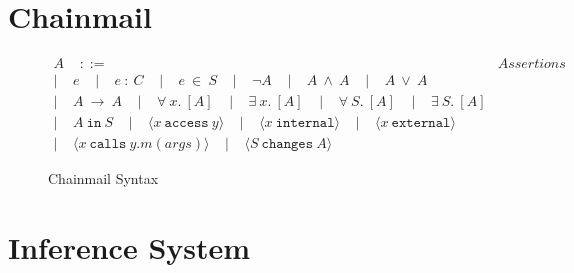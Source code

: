 \documentclass[acmsmall,review,anonymous]{acmart}\settopmatter{printfolios=true,printccs=false,printacmref=false}
\newcommand\calls[4]{\langle #1\ \texttt{calls}\ #2.#3(#4) \rangle}
\newcommand\changes[2]{\langle #1\ \texttt{changes}\ #2 \rangle}
\newcommand\access[2]{\langle #1\ \texttt{access}\ #2 \rangle}
\newcommand\internal[1]{\langle #1\ \texttt{internal}\rangle}
\newcommand\external[1]{\langle #1\ \texttt{external}\rangle}
\begin{document}
\section{Chainmail}
\begin{figure}[h]
\[
\begin{array}{lr}
A\;\;\;\; ::= & \textit{Assertions}\\  
|\;\;\;\; e                        \;\;\;\;  
|\;\;\;\; e\ :\ C                  \;\;\;\;
|\;\;\;\; e\ \in\ S                \;\;\;\;
|\;\;\;\; \neg A 					\;\;\;\;
|\;\;\;\; A\ \wedge\ A 			\;\;\;\;
|\;\;\;\; A\ \vee\ A \\
|\;\;\;\; A\ \longrightarrow\ A 	\;\;\;\;
|\;\;\;\; \forall\ x.\ [A] 		\;\;\;\;
|\;\;\;\; \exists\ x.\ [A] 		\;\;\;\;
|\;\;\;\; \forall\ S.\ [A] 		\;\;\;\;
|\;\;\;\; \exists\ S.\ [A] 		\\
|\;\;\;\; A\ \texttt{in}\ S        \;\;\;\; 
|\;\;\;\; \access{x}{y}            \;\;\;\;
|\;\;\;\; \internal{x}             \;\;\;\; 
|\;\;\;\; \external{x}             \\
|\;\;\;\; \calls{x}{y}{m}{args} 	\;\;\;\;
|\;\;\;\; \changes{S}{A} 			
\end{array}
\]
\caption{Chainmail Syntax}
\label{f:chainmail_assertions}
\end{figure}

\section{Inference System}
\end{document}
